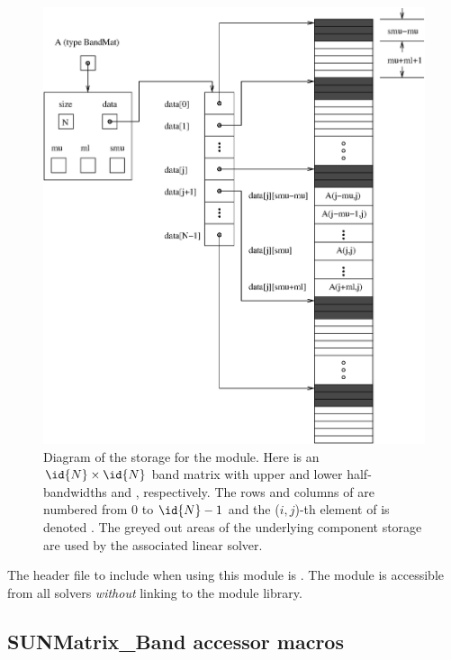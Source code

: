\begin{figure}
\centerline{\includegraphics[width=4.5 in]{bandmat}}
\caption[Diagram of the storage for a {\sunmatband} object]
  {Diagram of the storage for the {\sunmatband} module. Here  is an
  $\id{N} \times \id{N}$ band matrix with upper and lower half-bandwidths 
  and , respectively. The rows and columns of  are
  numbered from $0$ to $\id{N}-1$ and the ($i,j$)-th element of  is
  denoted . The greyed out areas of the underlying
  component storage are used by the associated {\sunlinsolband}
  linear solver.}\label{f:sunbandmat}
\end{figure}

\noindent The header file to include when using this module
is . The {\sunmatband} module
is accessible from all {\sundials} solvers \textit{without}
linking to the \newline
{} module library.


\subsection{SUNMatrix\_Band accessor macros}
\label{ss:sunmat_band_macros}

